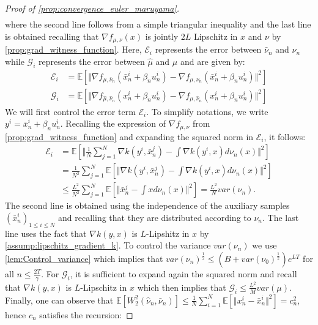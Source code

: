 \begin{proof}[Proof of \cref{prop:convergence_euler_maruyama}]
\begin{align*}
\end{align*}
where the second line follows from a simple triangular inequality and the last line is obtained recalling that $\nabla f_{\mu,\nu}(x)$
is jointly $2L$ Lipschitz in $x$ and $\nu$ by \cref{prop:grad_witness_function}. Here, $\mathcal{E}_{i}$ represents the error between $\bar{\nu}_n$ and $\nu_n$ while $\mathcal{G}_{i}$  represents the error between $\hat{\mu}$ and $\mu$ and are given by: 
\begin{align*}
\mathcal{E}_{i} & =\mathbb{E}[\Vert\nabla f_{\mu,\bar{\nu}_{n}}(\bar{x}_{n}^{i}+\beta_{n}u_{n}^{i})-\nabla f_{\mu,\nu_{n}}(\bar{x}_{n}^{i}+\beta_{n}u_{n}^{i})\Vert^{2}]\\
\mathcal{G}_{i} & =\mathbb{E}[\Vert\nabla f_{\hat{\mu},\hat{\nu}_{n}}(x_{n}^{i}+\beta_{n}u_{n}^{i})-\nabla f_{\mu,\hat{\nu}_{n}}(x_{n}^{i}+\beta_{n}u_{n}^{i})\Vert^{2}]
\end{align*}
We will first control the error term $\mathcal{E}_i$. To simplify
notations, we write $y^{i}=\bar{x}_{n}^{i}+\beta_{n}u_{n}^{i}$. Recalling the expression of $\nabla f_{\mu,\nu}$ from \cref{prop:grad_witness_function} and expanding the squared norm in $\mathcal{E}_i$, it follows:
\begin{align*}
\mathcal{E}_{i} & =\mathbb{E}[\Vert\frac{1}{N}\sum_{j=1}^{N}\nabla k(y^{i},\bar{x}_{n}^{j})-\int\nabla k(y^{i},x)d\nu_{n}(x)\Vert^{2}]\\
 & =\frac{1}{N^{2}}\sum_{j=1}^{N}\mathbb{E}\left[\Vert\nabla k(y^{i},\bar{x}_{n}^{j})-\int\nabla k(y^{i},x)d\nu_{n}(x)\Vert^{2}\right]\\
 & \leq\frac{L^{2}}{N^{2}}\sum_{j=1}^{N}\mathbb{E}[\Vert\bar{x}_{n}^{j}-\int xd\nu_{n}(x)\Vert^{2}]=\frac{L^{2}}{N}var(\nu_{n}).
\end{align*}
The second line is obtained using the independence of the auxiliary samples $(\bar{x}^{i}_n)_{1\le i\le N}$ and recalling that they are distributed according to $\nu_{n}$. The last line uses the fact that $\nabla k(y,x)$ is $L$-Lipshitz in $x$ by \cref{assump:lipschitz_gradient_k}. To control the variance $var(\nu_n)$ we use  \cref{lem:Control_variance} which implies that $var(\nu_{n})^{\frac{1}{2}}\leq(B+var(\nu_{0})^{\frac{1}{2}})e^{LT}$ for all $n\leq\frac{2T}{\gamma}$.
For $\mathcal{G}_{i}$, it is sufficient to expand again the squared norm and recall that $\nabla k(y,x)$ is $L$-Lipschitz in $x$ which then implies that $\mathcal{G}_{i}\leq\frac{L^{2}}{M}var(\mu)$. Finally, one can observe that  $\mathbb{E}[W_{2}^{2}(\hat{\nu}_{n},\bar{\nu}_{n})]\leq\frac{1}{N}\sum_{i=1}^{N}\mathbb{E}\left[\Vert x_{n}^{i}-\bar{x}_{n}^{i}\Vert^{2}\right]=c_{n}^{2}$, hence $c_n$ satisfies the recursion:

\end{proof}
